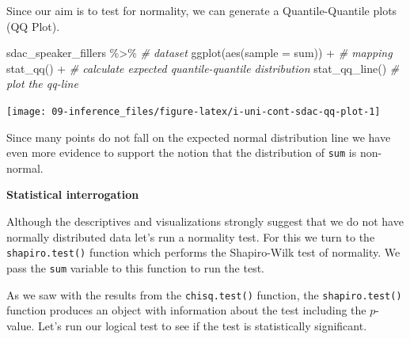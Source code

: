\documentclass[
]{article}
\newenvironment{Shaded}{\begin{snugshade}}{\end{snugshade}}
\newcommand{\AttributeTok}[1]{\textcolor[rgb]{0.77,0.63,0.00}{#1}}
\newcommand{\CommentTok}[1]{\textcolor[rgb]{0.56,0.35,0.01}{\textit{#1}}}
\newcommand{\FunctionTok}[1]{\textcolor[rgb]{0.00,0.00,0.00}{#1}}
\newcommand{\NormalTok}[1]{#1}
\newcommand{\OtherTok}[1]{\textcolor[rgb]{0.56,0.35,0.01}{#1}}
\newcommand{\SpecialCharTok}[1]{\textcolor[rgb]{0.00,0.00,0.00}{#1}}
\begin{document}
Since our aim is to test for normality, we can generate a Quantile-Quantile plots (QQ Plot).

\begin{Shaded}
\begin{Highlighting}[]
\NormalTok{sdac\_speaker\_fillers }\SpecialCharTok{\%\textgreater{}\%} \CommentTok{\# dataset}
  \FunctionTok{ggplot}\NormalTok{(}\FunctionTok{aes}\NormalTok{(}\AttributeTok{sample =}\NormalTok{ sum)) }\SpecialCharTok{+} \CommentTok{\# mapping}
  \FunctionTok{stat\_qq}\NormalTok{() }\SpecialCharTok{+} \CommentTok{\# calculate expected quantile{-}quantile distribution}
  \FunctionTok{stat\_qq\_line}\NormalTok{() }\CommentTok{\# plot the qq{-}line}
\end{Highlighting}
\end{Shaded}

\begin{center}\texttt{[image: 09-inference\_files/figure-latex/i-uni-cont-sdac-qq-plot-1]} \end{center}

Since many points do not fall on the expected normal distribution line we have even more evidence to support the notion that the distribution of \texttt{sum} is non-normal.

\textbf{Statistical interrogation}

Although the descriptives and visualizations strongly suggest that we do not have normally distributed data let's run a normality test. For this we turn to the \texttt{shapiro.test()} function which performs the Shapiro-Wilk test of normality. We pass the \texttt{sum} variable to this function to run the test.

\begin{Shaded}
\end{Shaded}

As we saw with the results from the \texttt{chisq.test()} function, the \texttt{shapiro.test()} function produces an object with information about the test including the \(p\)-value. Let's run our logical test to see if the test is statistically significant.
\end{document}
